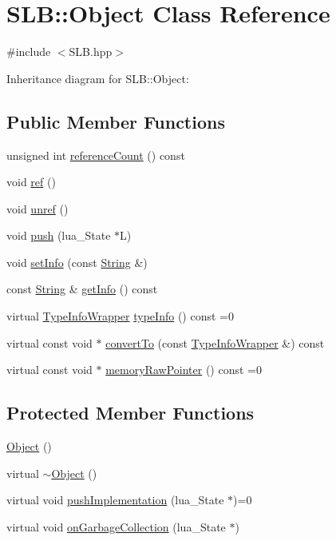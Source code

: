 \hypertarget{classSLB_1_1Object}{}\section{S\+LB\+:\+:Object Class Reference}
\label{classSLB_1_1Object}


{\ttfamily \#include $<$S\+L\+B.\+hpp$>$}



Inheritance diagram for S\+LB\+:\+:Object\+:
\subsection*{Public Member Functions}
\begin{DoxyCompactItemize}
\item 
unsigned int \hyperlink{classSLB_1_1Object_ac28bcd31a077027d40ad8d2fd377c798}{reference\+Count} () const 
\item 
void \hyperlink{classSLB_1_1Object_ae2da306891334eb87b40d4b39c9edc2a}{ref} ()
\item 
void \hyperlink{classSLB_1_1Object_aa21630921633035bd34f11202e0fd343}{unref} ()
\item 
void \hyperlink{classSLB_1_1Object_af87e4e6ba4a0c3b5b48a91132447dd39}{push} (lua\+\_\+\+State $\ast$L)
\item 
void \hyperlink{classSLB_1_1Object_a3b7114209b2a95a5b57686db2e370e63}{set\+Info} (const \hyperlink{namespaceSLB_a6a4c36e7004d99c0535c2c91c200c9a1}{String} \&)
\item 
const \hyperlink{namespaceSLB_a6a4c36e7004d99c0535c2c91c200c9a1}{String} \& \hyperlink{classSLB_1_1Object_a97ff91e7c30e87870df92909a01704cf}{get\+Info} () const 
\item 
virtual \hyperlink{classSLB_1_1TypeInfoWrapper}{Type\+Info\+Wrapper} \hyperlink{classSLB_1_1Object_ad4f64d93ad3b8b0cc8b41c1ffc8b47cf}{type\+Info} () const =0
\item 
virtual const void $\ast$ \hyperlink{classSLB_1_1Object_a6fb09cc09d08edf65f5e80f2e0fa014c}{convert\+To} (const \hyperlink{classSLB_1_1TypeInfoWrapper}{Type\+Info\+Wrapper} \&) const 
\item 
virtual const void $\ast$ \hyperlink{classSLB_1_1Object_a05fca24264503c773b279df3393f024e}{memory\+Raw\+Pointer} () const =0
\end{DoxyCompactItemize}
\subsection*{Protected Member Functions}
\begin{DoxyCompactItemize}
\item 
\hyperlink{classSLB_1_1Object_ac2e7be75268d57e98ada537d0b5c364d}{Object} ()
\item 
virtual \hyperlink{classSLB_1_1Object_a3388d4006a864b795b3883f0ab3e8811}{$\sim$\+Object} ()
\item 
virtual void \hyperlink{classSLB_1_1Object_a3dddf6a764c19ed37f6af797f0b0b453}{push\+Implementation} (lua\+\_\+\+State $\ast$)=0
\item 
virtual void \hyperlink{classSLB_1_1Object_ac92bdf255695fc53dbb2be7c674b328a}{on\+Garbage\+Collection} (lua\+\_\+\+State $\ast$)
\end{DoxyCompactItemize}
